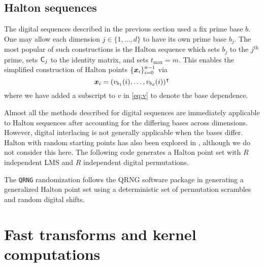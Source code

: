 \documentclass[acmsmall]{acmart}
\begin{document}
\subsection{Halton sequences}

The digital sequences described in the previous section used a fix prime base $b$. One may allow each dimension $j \in \{1,\dots,d\}$ to have its own prime base $b_j$. The most popular of such constructions is the Halton sequence which sets $b_j$ to the $j^\mathrm{th}$ prime, sets ${\mathsf{C}}_j$ to the identity matrix, and sets $t_\mathrm{max} = m$. This enables the simplified construction of Halton points $\{{\boldsymbol{x}}_i\}_{i=0}^{n-1}$ via
$${\boldsymbol{x}}_i = (v_{b_1}(i),\dots,v_{b_d}(i))^\intercal$$
where we have added a subscript to $v$ in \eqref{eq:v} to denote the base dependence. 

Almost all the methods described for digital sequences are immediately applicable to Halton sequences after accounting for the differing bases across dimensions. However, digital interlacing is not generally applicable when the bases differ. Halton with random starting points has also been explored in \citep{wang2000randomized}, although we do not consider this here.
The following code generates a Halton point set with $R$ independent LMS and $R$ independent digital permutations.

The \texttt{QRNG} randomization follows the QRNG software package \citep{qrng.software} in generating a generalized Halton point set \citep{faure2009generalized} using a deterministic set of  permutation scrambles and random digital shifts. 

\section{Fast transforms and kernel computations} \label{sec:fast_transforms}
\end{document}

